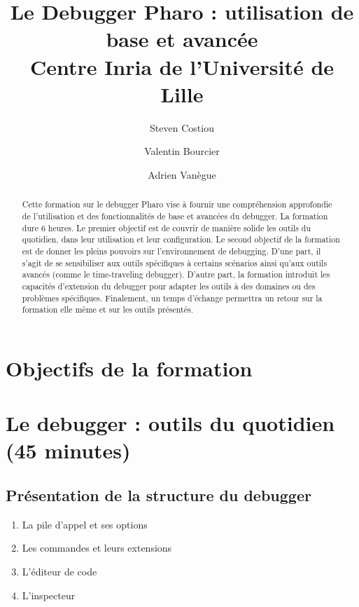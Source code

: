 \documentclass[manuscript, language=english, language=french, nonacm]{acmart}
\begin{document}
\title{Le Debugger Pharo : utilisation de base et avancée\\
Centre Inria de l'Université de Lille}
\author{Steven Costiou}
\author{Valentin Bourcier}
\author{Adrien Vanègue}




\begin{abstract}
    
Cette formation sur le debugger Pharo vise à fournir une compréhension approfondie de l'utilisation et des fonctionnalités de base et avancées du debugger.
La formation dure 6 heures.
Le premier objectif est de couvrir de manière solide les outils du quotidien, dans leur utilisation et leur configuration.
Le second objectif de la formation est de donner les pleins pouvoirs sur l'environnement de debugging.
D'une part, il s'agit de se sensibiliser aux outils spécifiques à certains scénarios ainsi qu'aux outils avancés (comme le time-traveling debugger).
D'autre part, la formation introduit les capacités d'extension du debugger pour adapter les outils à des domaines ou des problèmes spécifiques.
Finalement, un temps d'échange permettra un retour sur la formation elle même et sur les outils présentés.



\end{abstract}

\maketitle

\section{Objectifs de la formation} 

\section{Le debugger : outils du quotidien (45 minutes)}
 
\subsection{Présentation de la structure du debugger}

\begin{enumerate}
    \item La pile d'appel et ses options
    \item Les commandes et leurs extensions       
    \item L'éditeur de code
    \item L'inspecteur
\end{enumerate}
\end{document}
